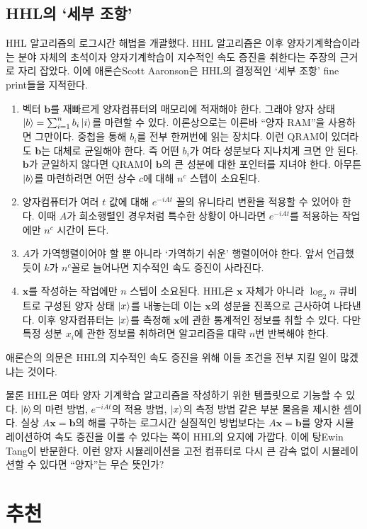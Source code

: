 \documentclass[a4paper,atbegshi,chapter,itemph,hidelinks]{oblivoir}
\begin{document}
\section{HHL의 `세부 조항'}
HHL 알고리즘의 로그시간 해법을 개괄했다. HHL 알고리즘은 이후 양자기계학습이라는
분야 자체의 초석이자 양자기계학습이 지수적인 속도 증진을 취한다는 주장의 근거로
자리 잡았다. 이에 애론슨{\tiny Scott Aaronson}은 HHL의 결정적인 `세부 조항'{\tiny
fine print}들을 지적한다.
\hfill\break
\begin{enumerate}[label=(\alph*)]
  \item 벡터 $\pmb{b}$를 재빠르게 양자컴퓨터의 매모리에 적재해야 한다. 그래야
    양자 상태 $\ket{b}=\sum_{i=1}^n b_i\ket{i}$를 마련할 수 있다. 이론상으로는
    이른바  ``양자 RAM''을 사용하면 그만이다. 중첩을 통해 $b_i$를 전부 한꺼번에
    읽는 장치다. 이런 QRAM이 있더라도 $\pmb{b}$는 대체로 균일해야 한다. 즉
    어떤 $b_i$가 여타 성분보다 지나치게 크면 안 된다. $\pmb{b}$가 균일하지
    않다면 QRAM이 $\pmb{b}$의 큰 성분에 대한 포인터를 지녀야 한다. 아무튼
    $\ket{b}$를 마련하려면 어떤 상수 $c$에 대해 $n^c$ 스텝이 소요된다.
  \item 양자컴퓨터가 여러 $t$ 값에 대해 $e^{-iAt}$ 꼴의 유니타리 변환을 적용할
    수 있어야 한다. 이때 $A$가 희소행렬인 경우처럼 특수한 상황이 아니라면
    $e^{-iAt}$를 적용하는 작업에만 $n^c$ 시간이 든다.
  \item $A$가 가역행렬이어야 할 뿐 아니라 `가역하기 쉬운' 행렬이어야 한다.
    앞서 언급했듯이 $k$가 $n^c$꼴로 늘어나면 지수적인 속도 증진이 사라진다.
  \item $\pmb{x}$를 작성하는 작업에만 $n$ 스텝이 소요된다.
    HHL은 $\pmb{x}$ 자체가 아니라 $\log_2n$ 큐비트로 구성된 양자 상태 $\ket{x}$를
    내놓는데 이는 $\pmb{x}$의 성분을 진폭으로 근사하여 나타낸다. 이후
    양자컴퓨터는 $\ket{x}$를 측정해 $\pmb{x}$에 관한 통계적인 정보를 취할 수 있다.
    다만 특정 성분 $x_i$에 관한 정보를 취하려면 알고리즘을 대략 $n$번 반복해야
    한다.
\end{enumerate}
\hfill\break
애론슨의 의문은 HHL의 지수적인 속도 증진을 위해 이들 조건을 전부 지킬 일이
많겠냐는 것이다. 

물론 HHL은 여타 양자 기계학습 알고리즘을 작성하기 위한 템플릿으로 기능할 수 있다.
$\ket{b}$의 마련 방법, $e^{-iAt}$의 적용 방법, $\ket{x}$의 측정 방법 같은 부분
물음을 제시한 셈이다. 실상 $A\pmb{x}=\pmb{b}$의 해를 구하는 로그시간 실질적인
방법보다는 $A\pmb{x}= \pmb{b}$를 양자 시뮬레이션하여 속도 증진을 이룰 수 있다는
쪽이 HHL의 요지에 가깝다. 이에 탕{\tiny Ewin Tang}이 반문한다. 이런 양자
시뮬레이션을 고전 컴퓨터로 다시 큰 감속 없이 시뮬레이션할 수 있다면 ``양자''는
무슨 뜻인가?
\chapter{추천}
\end{document}
